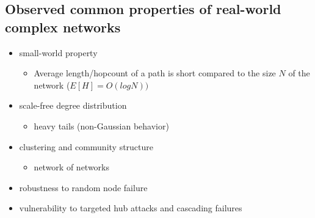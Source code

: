 \subsection{Observed common properties of real-world complex networks}

\begin{itemize}
  \item small-world property
  \begin{itemize}
    \item Average length/hopcount of a path is short compared to the size $N$ of the network
    ($E[H] = O(log N))$
  \end{itemize}
  \item scale-free degree distribution
  \begin{itemize}
    \item heavy tails (non-Gaussian behavior)
  \end{itemize}
  \item clustering and community structure
  \begin{itemize}
    \item network of networks
  \end{itemize}
  \item robustness to random node failure
  \item vulnerability to targeted hub attacks and cascading failures
\end{itemize}









